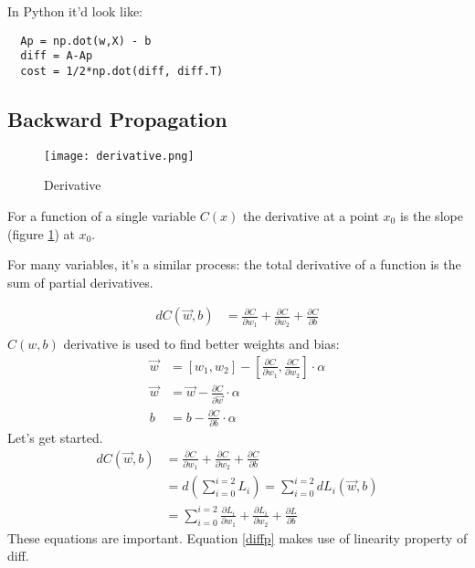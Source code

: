 In Python it'd look like:
\begin{center}
  \begin{BVerbatim}
  Ap = np.dot(w,X) - b
  diff = A-Ap 
  cost = 1/2*np.dot(diff, diff.T)
  \end{BVerbatim}
\end{center}





\subsection{Backward Propagation}
\begin{figure}
  \centering
  \texttt{[image: derivative.png]}
  \caption{Derivative}\label{fig:basics}
\end{figure}

For a function of a single variable $C(x)$ the derivative at a point $x_0$ is the slope (figure \ref{fig:basics}) at $x_0$.

For many variables, it's a similar process: the total derivative of a function is the sum of partial derivatives.

\begin{align}
  dC(\vec{w},b) &= \frac{\partial C}{\partial w_1}+ \frac{\partial C}{\partial w_2} + \frac{\partial C}{\partial b}\\
\end{align}
$C(w,b)$ derivative is used to find better weights and bias:
\begin{align*}
  \vec{w} &= [w_1, w_2] - [\frac{\partial C}{\partial w_1},\frac{\partial C}{\partial w_2}]\cdot{}\alpha\\
  \vec{w} &= \vec{w} -\frac{\partial C}{\partial \vec{w}}\cdot{}\alpha\\
  b &= b -\frac{\partial C}{\partial b}\cdot{}\alpha
\end{align*}
Let's get started.
\begin{align}
  dC(\vec{w},b) &= \frac{\partial C}{\partial w_1}+ \frac{\partial C}{\partial w_2} + \frac{\partial C}{\partial b}\\
  &= d(\sum_{i=0}^{i=2}L_i) = \sum_{i=0}^{i=2}dL_i(\vec{w},b) \label{diffp}\\
  &=\sum_{i=0}^{i=2} \frac{\partial L_i}{\partial w_1} +\frac{\partial L_i}{\partial w_2} + \frac{\partial L}{\partial b}
\end{align} 
These equations are important. Equation \ref{diffp} makes use of linearity property of diff.

